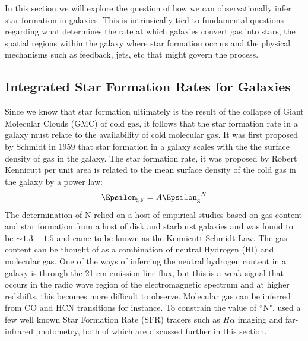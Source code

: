 In this section we will explore the question of how we can observationally infer star formation in galaxies. This is intrinsically tied to fundamental questions regarding what determines the rate at which galaxies convert gas into stars, the spatial regions within the galaxy where star formation occurs and the physical mechanisms such as feedback, jets, etc that might govern the process. 

\subsection{Integrated Star Formation Rates for Galaxies}

Since we know that star formation ultimately is the result of the collapse of Giant Molecular Clouds (GMC) of cold gas, it follows that the star formation rate in a galaxy must relate to the availability of cold molecular gas. It was first proposed by Schmidt in 1959 \citep{959ApJ...129..243S} that star formation in a galaxy scales with the the surface density of gas in the galaxy. The star formation rate, it was proposed by Robert Kennicutt \citep{1998ApJ...498..541K} per unit area is related to the mean surface density of the cold gas in the galaxy by a power law:\\
$$\Epsilon_{\rm SF}  = A{\Epsilon_{\rm g}}^N$$
The determination of N relied on a host of empirical studies based on gas content and star formation from a host of disk and starburst galaxies and was found to be $\sim 1.3-1.5$ and came to be known as the Kennicutt-Schmidt Law.  The gas content can be thought of as a combination of neutral Hydrogen (HI) and molecular gas. One of the ways of inferring the neutral hydrogen content in a galaxy is through the 21 cm emission line flux, but this is a weak signal that occurs in the radio wave region of the electromagnetic spectrum and at higher redshifts, this becomes more difficult to observe. Molecular gas can be inferred from CO and HCN transitions for instance. To constrain the value of ``N",  \citet{1998ApJ...498..541K} used a few well known Star Formation Rate (SFR) tracers such as $H\alpha$ imaging and far-infrared photometry, both of which are discussed further in this section.\\

